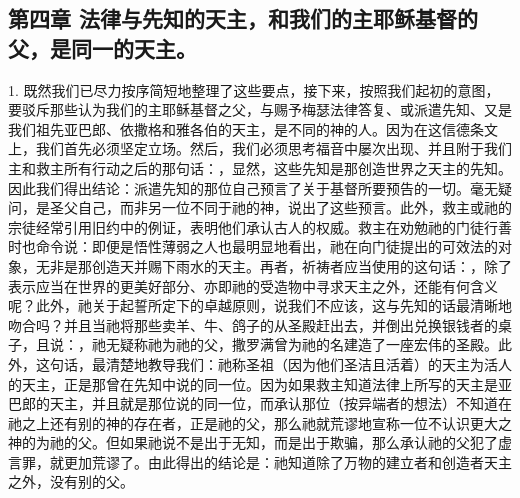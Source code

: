 
\subsection{第四章 法律与先知的天主，和我们的主耶稣基督的父，是同一的天主。}

1. 既然我们已尽力按序简短地整理了这些要点，接下来，按照我们起初的意图，要驳斥那些认为我们的主耶稣基督之父，与赐予梅瑟法律答复、或派遣先知、又是我们祖先亚巴郎、依撒格和雅各伯的天主，是不同的神的人。因为在这信德条文上，我们首先必须坚定立场。然后，我们必须思考福音中屡次出现、并且附于我们主和救主所有行动之后的那句话：，显然，这些先知是那创造世界之天主的先知。因此我们得出结论：派遣先知的那位自己预言了关于基督所要预告的一切。毫无疑问，是圣父自己，而非另一位不同于祂的神，说出了这些预言。此外，救主或祂的宗徒经常引用旧约中的例证，表明他们承认古人的权威。救主在劝勉祂的门徒行善时也命令说：即便是悟性薄弱之人也最明显地看出，祂在向门徒提出的可效法的对象，无非是那创造天并赐下雨水的天主。再者，祈祷者应当使用的这句话：，除了表示应当在世界的更美好部分、亦即祂的受造物中寻求天主之外，还能有何含义呢？此外，祂关于起誓所定下的卓越原则，说我们不应该，这与先知的话最清晰地吻合吗？并且当祂将那些卖羊、牛、鸽子的从圣殿赶出去，并倒出兑换银钱者的桌子，且说：，祂无疑称祂为祂的父，撒罗满曾为祂的名建造了一座宏伟的圣殿。此外，这句话，最清楚地教导我们：祂称圣祖（因为他们圣洁且活着）的天主为活人的天主，正是那曾在先知中说的同一位。因为如果救主知道法律上所写的天主是亚巴郎的天主，并且就是那位说的同一位，而承认那位（按异端者的想法）不知道在祂之上还有别的神的存在者，正是祂的父，那么祂就荒谬地宣称一位不认识更大之神的为祂的父。但如果祂说不是出于无知，而是出于欺骗，那么承认祂的父犯了虚言罪，就更加荒谬了。由此得出的结论是：祂知道除了万物的建立者和创造者天主之外，没有别的父。\par


